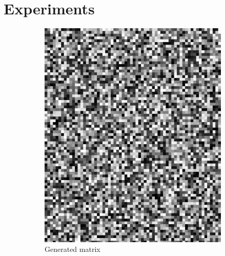 \documentclass{llncs}
\begin{document}
\section{Experiments}

\begin{figure}[t]
\centering
\begin{subfigure}[t]{0.25\textwidth}
\centering
\includegraphics[scale=.9]{img/exp_input_2_cropped.png}
\caption{Generated matrix}
\label{fig:rila}
\end{subfigure}%
~
\begin{subfigure}[t]{0.25\textwidth}
\centering

\end{subfigure}
\end{figure}
\end{document}
